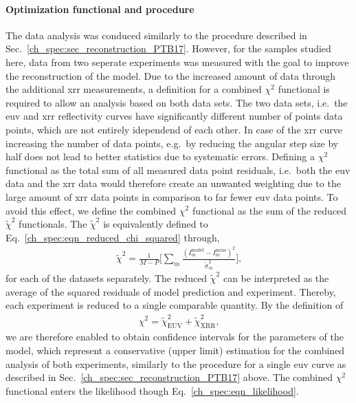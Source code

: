 \paragraph{Optimization functional and procedure}
The data analysis was conduced similarly to the procedure described in Sec.~\ref{ch_spec:sec_reconstruction_PTB17}. However, for the samples studied here, data from two seperate experiments was measured with the goal to improve the reconstruction of the model. Due to the increased amount of data through the additional \gls{xrr} measurements, a definition for a combined $\chi^2$ functional is required to allow an analysis based on both data sets. The two data sets, i.e.~the \gls{euv} and \gls{xrr} reflectivity curves have significantly different number of points data points, which are not entirely idependend of each other. In case of the \gls{xrr} curve increasing the number of data points, e.g.~by reducing the angular step size by half does not lead to better statistics due to systematic errors. Defining a $\chi^2$ functional as the total sum of all measured data point residuals, i.e.~both the \gls{euv} data and the \gls{xrr} data would therefore create an unwanted weighting due to the large amount of \gls{xrr} data points in comparison to far fewer \gls{euv} data points. To avoid this effect, we define the combined $\chi^2$ functional as the sum of the reduced $\tilde{\chi}^2$ functionals. The $\tilde{\chi}^2$ is equivalently defined to Eq.~\eqref{ch_spec:eqn_reduced_chi_squared} through,\begin{align}
\tilde{\chi}^2 = \frac{1}{M-P} \bigg[\sum\limits_{m} \frac{(I_m^\text{model} 
- I_m^\text{meas})^2}{\tilde{\sigma}_m^2} \bigg] \text{,}
\end{align}
for each of the datasets separately. The reduced $\tilde{\chi}^2$ can be interpreted as the average of the squared residuals of model prediction and experiment. Thereby, each experiment is reduced to a single comparable quantity. By the definition of
\begin{align}
\chi^2 = \tilde{\chi}^2_\text{EUV} +\tilde{\chi}^2_\text{XRR} \text{,}
\label{ch_spec:eqn_Mo_Si_C_total_chi_2}
\end{align}
we are therefore enabled to obtain confidence intervals for the parameters of the model, which represent a conservative (upper limit) estimation for the combined analysis of both experiments, similarly to the procedure for a single \gls{euv} curve as described in Sec.~\ref{ch_spec:sec_reconstruction_PTB17} above. The combined $\chi^2$ functional enters the likelihood though Eq.~\ref{ch_spec:eqn_likelihood}.

